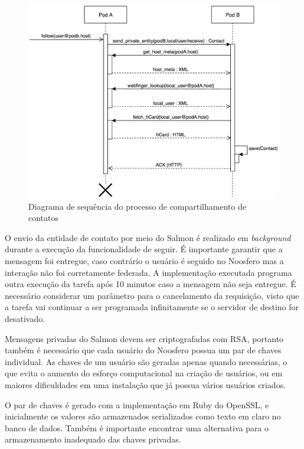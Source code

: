 \begin{figure}[h]
	\centering
		\includegraphics[keepaspectratio=true,scale=0.5]{figuras/seq_contato.eps}
	\caption{Diagrama de sequência do processo de compartilhamento de contatos}
	\label{fig:seq_contato}
\end{figure}

O envio da entidade de contato por meio do Salmon é realizado em \textit{background}
durante a execução da funcionalidade de seguir. É importante garantir que a mensagem
foi entregue, caso contrário o usuário é seguido no Noosfero mas a interação não foi
corretamente federada. A implementação executada programa outra execução da tarefa
após 10 minutos caso a mensagem não seja entregue. É necessário considerar um
parâmetro para o cancelamento da requisição, visto que a tarefa vai continuar a ser
programada infinitamente se o servidor de destino for desativado.

Mensagens privadas do Salmon devem ser criptografadas com RSA, portanto também é
necessário que cada usuário do Noosfero possua um par de chaves individual. As
chaves de um usuário são geradas apenas quando necessárias, o que evita o aumento do
esforço computacional na criação de usuários, ou em maiores dificuldades em uma
instalação que já possua vários usuários criados.

O par de chaves é gerado com a implementação em Ruby do OpenSSL, e inicialmente os
valores são armazenados serializados como texto em claro no banco de dados. Também
é importante encontrar uma alternativa para o armazenamento inadequado das chaves
privadas.

